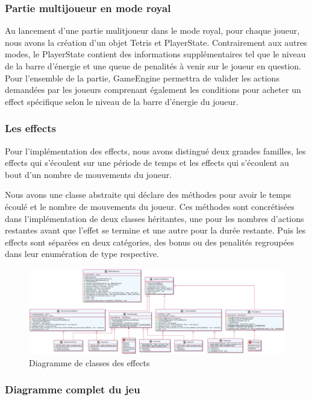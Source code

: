 \documentclass{article}
\begin{document}
\subsubsection{Partie multijoueur en mode royal}

Au lancement d'une partie mulitjoueur dans le mode royal, pour chaque joueur, nous avons la création d'un objet Tetris et PlayerState. Contrairement aux autres modes, le PlayerState contient des informations supplémentaires tel que le niveau de la barre d'énergie et une queue de penalités à venir sur le joueur en question. Pour l'ensemble de la partie, GameEngine permettra de valider les actions demandées par les joueurs comprenant également les conditions pour acheter un effect spécifique selon le niveau de la barre d'énergie du joueur. 

\subsubsection*{Les effects}

Pour l'implémentation des effects, nous avons distingué deux grandes familles, les effects qui s'écoulent sur une période de temps et les effects qui s'écoulent au bout d'un nombre de mouvements du joueur.

Nous avons une classe abstraite qui déclare des méthodes pour avoir le temps écoulé et le nombre de mouvements du joueur. Ces méthodes sont concrétisées dans l'implémentation de deux classes héritantes, une pour les nombres d'actions restantes avant que l'effet se termine et une autre pour la durée restante. Puis les effects sont séparées en deux catégories, des bonus ou des penalités regroupées dans leur enumération de type respective. 

\begin{figure}[H]
    \centering
    \includegraphics[scale=0.3, angle=90]{../res/uml/class/EffectClass.png}
    \caption{Diagramme de classes des effects}
    \label{fig:EffectDiagramm}
\end{figure}

\subsubsection{Diagramme complet du jeu}
\end{document}
